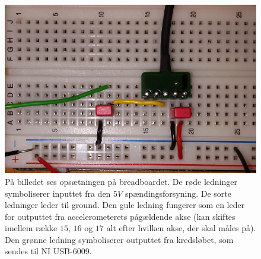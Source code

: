 \begin{figure}[H]
	\centering
	\includegraphics[scale=0.15]{figures/cProblemloesning/PF2.jpg}
	\caption{På billedet ses opsætningen på breadboardet. De røde ledninger symboliserer inputtet fra den $5V$ spændingsforsyning. De sorte ledninger leder til ground. Den gule ledning fungerer som en leder for outputtet fra accelerometerets pågældende akse (kan skiftes imellem række $15$, $16$ og $17$ alt efter hvilken akse, der skal måles på). Den grønne ledning symboliserer outputtet fra kredsløbet, som sendes til NI USB-6009.}
	\label{pforsoeg1}
\end{figure}

